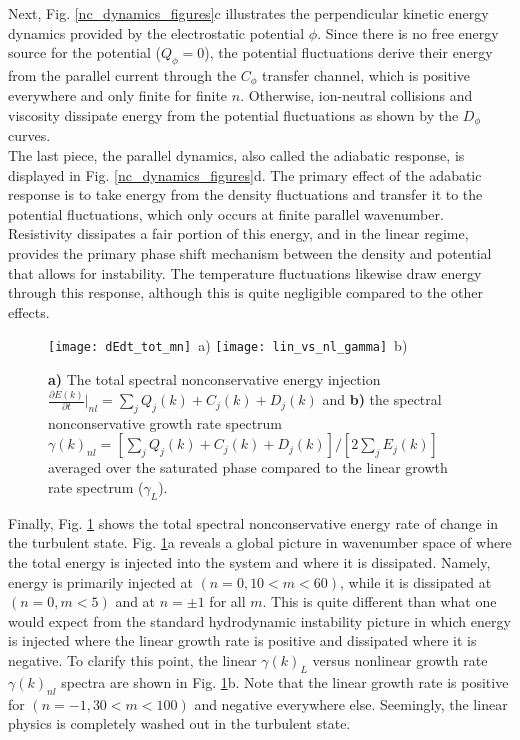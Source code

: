 \documentclass[12pt]{article}
\newcommand{\pdiff}[2]{\frac{\partial#1}{\partial#2}}
\begin{document}
Next, Fig. \ref{nc_dynamics_figures}c illustrates the perpendicular kinetic energy dynamics provided by the electrostatic potential $\phi$. 
Since there is no free energy source for the potential ($Q_\phi=0$),
the potential fluctuations derive their energy from the parallel current through the $C_\phi$ transfer channel, which is positive everywhere and only finite for finite $n$. Otherwise, ion-neutral
collisions and viscosity dissipate energy from the potential fluctuations as shown by the $D_\phi$ curves. \\

The last piece, the parallel dynamics, also called the adiabatic response, is displayed in Fig. \ref{nc_dynamics_figures}d. 
The primary effect of the adabatic response is to take energy from the density
fluctuations and transfer it to the potential fluctuations, which only occurs at finite parallel wavenumber. Resistivity dissipates a fair portion of this energy, and in the linear regime, provides
the primary phase shift mechanism between the density and potential that allows for instability. The temperature fluctuations likewise draw energy through this response, although this is
quite negligible compared to the other effects. \\

\begin{figure}
\texttt{[image: dEdt\_tot\_mn]}~a)
\hfil
\texttt{[image: lin\_vs\_nl\_gamma]}~b)
\hfil
\caption{\textbf{a)} The total spectral nonconservative energy injection $\pdiff{E(k)}{t} \big|_{nl} = \sum_j Q_j(k) + C_j(k) + D_j(k)$ and
\textbf{b)} the spectral nonconservative growth rate spectrum $\gamma(k)_{nl} = [\sum_j Q_j(k) + C_j(k) + D_j(k)]/[2 \sum_j E_j(k)]$ averaged over the saturated phase
compared to the linear growth rate spectrum ($\gamma_L$).}
\label{dEdt_tot_fig}
\end{figure}

Finally, Fig. \ref{dEdt_tot_fig} shows the total spectral nonconservative energy rate of change in the turbulent state. Fig. \ref{dEdt_tot_fig}a reveals a global picture in wavenumber space of
where the total energy is injected into the system and where it is dissipated. Namely, energy is primarily injected at $(n=0, 10<m<60)$, while it is dissipated at $(n=0, m<5)$ and at $n=\pm 1$
for all $m$. This is quite different than what one would expect from the standard hydrodynamic instability picture in which energy is injected where the linear growth rate is positive and dissipated
where it is negative. To clarify this point, the linear $\gamma(k)_L$ versus nonlinear growth rate $\gamma(k)_{nl}$ spectra are shown in Fig. \ref{dEdt_tot_fig}b. Note that the linear growth rate
is positive for $(n=-1, 30<m<100)$ and negative everywhere else. Seemingly, the linear physics is completely washed out in the turbulent state. \\
\end{document}
